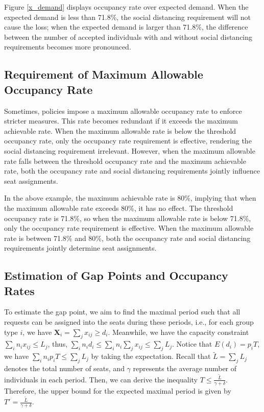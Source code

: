 Figure \ref{x_demand} displays occupancy rate over expected demand. When the expected demand is less than 71.8\%, the social distancing requirement will not cause the loss; when the expected demand is larger than 71.8\%, the difference between the number of accepted individuals with and without social distancing requirements becomes more pronounced.

\subsection*{Requirement of Maximum Allowable Occupancy Rate}
Sometimes, policies impose a maximum allowable occupancy rate to enforce stricter measures. This rate becomes redundant if it exceeds the maximum achievable rate. When the maximum allowable rate is below the threshold occupancy rate, only the occupancy rate requirement is effective, rendering the social distancing requirement irrelevant. However, when the maximum allowable rate falls between the threshold occupancy rate and the maximum achievable rate, both the occupancy rate and social distancing requirements jointly influence seat assignments.

In the above example, the maximum achievable rate is 80\%, implying that when the maximum allowable rate exceeds 80\%, it has no effect. The threshold occupancy rate is 71.8\%, so when the maximum allowable rate is below 71.8\%, only the occupancy rate requirement is effective. When the maximum allowable rate is between 71.8\% and 80\%, both the occupancy rate and social distancing requirements jointly determine seat assignments.


\subsection{Estimation of Gap Points and Occupancy Rates}
To estimate the gap point, we aim to find the maximal period such that all requests can be assigned into the seats during these periods, i.e., for each group type $i$, we have $\bm{X}_{i} = \sum_{j} x_{ij} \geq d_i$. Meanwhile, we have the capacity constraint $\sum_{i} n_{i} x_{ij} \leq L_j$, thus, $\sum_{i} n_i d_i \leq \sum_{i} n_i \sum_{j} x_{ij} \leq \sum_{j} L_{j}$. Notice that $E(d_i) = p_i T$, we have $\sum_{i} n_i p_i T \leq \sum_{j} L_{j}$ by taking the expectation. Recall that $\tilde{L} = \sum_{j} L_{j}$ denotes the total number of seats, and $\gamma$ represents the average number of individuals in each period. Then, we can derive the inequality $T \leq \frac{\tilde{L}}{\gamma + \delta}$. Therefore, the upper bound for the expected maximal period is given by $T' = \frac{\tilde{L}}{\gamma + \delta}$.

